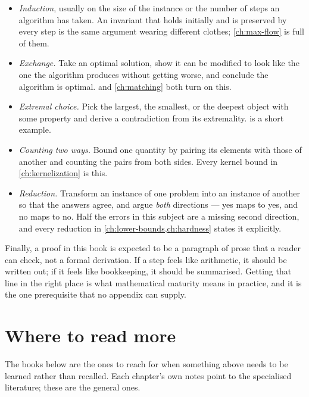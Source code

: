 \begin{itemize}[leftmargin=*]
  \item \emph{Induction}, usually on the size of the instance or the number of
        steps an algorithm has taken. An invariant that holds initially and is
        preserved by every step is the same argument wearing different clothes;
        \cref{ch:max-flow} is full of them.
  \item \emph{Exchange.} Take an optimal solution, show it can be modified to
        look like the one the algorithm produces without getting worse, and
        conclude the algorithm is optimal.  and
        \cref{ch:matching} both turn on this.
  \item \emph{Extremal choice.} Pick the largest, the smallest, or the
        deepest object with some property and derive a contradiction from its
        extremality.  is a short example.
  \item \emph{Counting two ways.} Bound one quantity by pairing its elements
        with those of another and counting the pairs from both sides. Every
        kernel bound in \cref{ch:kernelization} is this.
  \item \emph{Reduction.} Transform an instance of one problem into an instance
        of another so that the answers agree, and argue \emph{both} directions
        --- yes maps to yes, and no maps to no. Half the errors in this
        subject are a missing second direction, and every reduction in
        \cref{ch:lower-bounds,ch:hardness} states it explicitly.
\end{itemize}

Finally, a proof in this book is expected to be a paragraph of prose that a
reader can check, not a formal derivation. If a step feels like arithmetic, it
should be written out; if it feels like bookkeeping, it should be summarised.
Getting that line in the right place is what mathematical maturity means in
practice, and it is the one prerequisite that no appendix can supply.

\section{Where to read more}
\label{sec:prelim-reading}

The books below are the ones to reach for when something above needs to be
learned rather than recalled. Each chapter's own notes point to the specialised
literature; these are the general ones.

